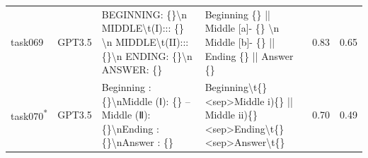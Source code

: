 \begin{longtable}{@{}p{0.8cm\tiny}p{1cm\tiny}p{4.1cm\ttfamily\tiny}p{4.1cm\ttfamily\tiny}p{0.8cm\tiny}p{0.8cm\tiny}@{}}
task069   & GPT3.5    & BEGINNING: \{\}\textbackslash{}n MIDDLE\textbackslash{}t(I)::: \{\} \textbackslash{}n MIDDLE\textbackslash{}t(II)::: \{\}\textbackslash{}n ENDING: \{\}\textbackslash{}n ANSWER: \{\}                                                                                                                                                                                                                                                                                                                                   & Beginning \{\} || Middle  {[}a{]}- \{\} \textbackslash{}n Middle  {[}b{]}- \{\} || Ending \{\} || Answer \{\}                                                                                                                                                                                                                                                                                                                                                                                                                                                                     & 0.83 & 0.65 \\
task070\textsuperscript{*}   & GPT3.5    & Beginning : \{\}\textbackslash{}nMiddle  (Ⅰ): \{\} -- Middle  (Ⅱ): \{\}\textbackslash{}nEnding : \{\}\textbackslash{}nAnswer : \{\}                                                                                                                                                                                                                                                                                                                                                                                     & Beginning\textbackslash{}t\{\} \textless{}sep\textgreater Middle i)\{\} || Middle ii)\{\} \textless{}sep\textgreater Ending\textbackslash{}t\{\} \textless{}sep\textgreater Answer\textbackslash{}t\{\}                                                                                                                                                                                                                                                                                                                                                                           & 0.70 & 0.49 \\

\end{longtable}
